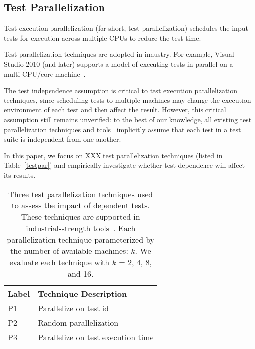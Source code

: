 \subsection{Test Parallelization}

Test execution parallelization (for short, test parallelization)
schedules the input tests for execution across
multiple CPUs to reduce the test time.

Test parallelization techniques are adopted in
industry. For example, Visual Studio 2010 (and later)
supports a model of executing tests in parallel on a multi-CPU/core machine~\cite{}.

The test independence assumption is critical to test
execution parallelization techniques, since scheduling tests
to multiple machines may change the execution environment
of each test and then affect the result. However, this critical
assumption still remains unverified: to the best of our
knowledge, all existing test parallelization techniques and
tools~\cite{} implicitly assume that each test in a test
suite is independent from one another.

In this paper, we focus on XXX test parallelization techniques
(listed in Table~\ref{testpar}) and empirically investigate whether test dependence will affect its
results.

\begin{table}
\centering
\setlength{\tabcolsep}{0.25\tabcolsep}
\begin{tabular}{|l|l|}
\hline
\textbf{Label} & \textbf{Technique Description} \\
\hline
P1 & Parallelize on test id\\
P2 & Random parallelization\\
P3 & Parallelize on test execution time\\
\hline
\end{tabular}
\caption{Three test parallelization techniques used
to assess the impact of dependent tests. These
techniques are supported in industrial-strength
tools~\cite{}. 
Each parallelization technique parameterized
by the number of available machines: $k$. We evaluate
each technique with $k$ = 2, 4, 8, and 16.
}
\label{tab:testpar}
\end{table}
